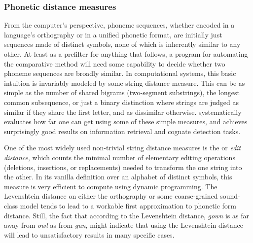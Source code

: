 \subsubsection{Phonetic distance measures}
From the computer's perspective, phoneme sequences, whether encoded in a language's orthography or in a unified phonetic format, are initially just sequences made of distinct symbols, none of which is inherently similar to any other. At least as a prefilter for anything that follows, a program for automating the comparative method will need some capability to decide whether two phoneme sequences are broadly similar. In computational systems, this basic intuition is invariably modeled by some string distance measure. This can be as simple as the number of shared bigrams (two-segment substrings), the longest common subsequence, or just a binary distinction where strings are judged as similar if they share the first letter, and as dissimilar otherwise. \citet{kondrak2005} systematically evaluates how far one can get using some of these simple measures, and achieves surprisingly good results on information retrieval and cognate detection tasks.

One of the most widely used non-trivial string distance measures is the \textit{} or \textit{edit distance}, which counts the minimal number of elementary editing operations (deletions, insertions, or replacements) needed to transform the one string into the other. In its vanilla definition over an alphabet of distinct symbols, this measure is very efficient to compute using dynamic programming. The Levenshtein distance on either the orthography or some coarse-grained sound-class model tends to lead to a workable first approximation to phonetic form distance. Still, the fact that according to the Levenshtein distance, \textit{gown} is as far away from \textit{owl} as from \textit{gun}, might indicate that using the Levenshtein distance will lead to unsatisfactory results in many specific cases.

